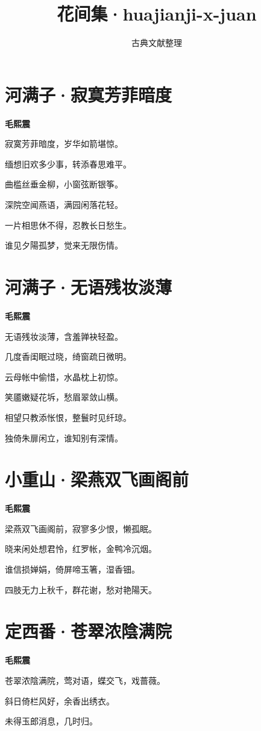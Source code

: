 \documentclass[12pt,a4paper]{ctexbook}
\title{花间集·huajianji-x-juan}
\author{古典文献整理}
\date{}
\begin{document}
\maketitle
\tableofcontents
\newpage
\section{河满子·寂寞芳菲暗度}
\textbf{毛熙震}\par\vspace{0.5em}
寂寞芳菲暗度，岁华如箭堪惊。\par
缅想旧欢多少事，转添春思难平。\par
曲槛丝垂金柳，小窗弦断银筝。\par
深院空闻燕语，满园闲落花轻。\par
一片相思休不得，忍教长日愁生。\par
谁见夕陽孤梦，觉来无限伤情。\par

\section{河满子·无语残妆淡薄}
\textbf{毛熙震}\par\vspace{0.5em}
无语残妆淡薄，含羞亸袂轻盈。\par
几度香闺眠过晓，绮窗疏日微明。\par
云母帐中偷惜，水晶枕上初惊。\par
笑靥嫩疑花坼，愁眉翠敛山横。\par
相望只教添怅恨，整鬟时见纤琼。\par
独倚朱扉闲立，谁知别有深情。\par

\section{小重山·梁燕双飞画阁前}
\textbf{毛熙震}\par\vspace{0.5em}
梁燕双飞画阁前，寂寥多少恨，懒孤眠。\par
晓来闲处想君怜，红罗帐，金鸭冷沉烟。\par
谁信损婵娟，倚屏啼玉箸，湿香钿。\par
四肢无力上秋千，群花谢，愁对艳陽天。\par

\section{定西番·苍翠浓陰满院}
\textbf{毛熙震}\par\vspace{0.5em}
苍翠浓陰满院，莺对语，蝶交飞，戏蔷薇。\par
斜日倚栏风好，余香出绣衣。\par
未得玉郎消息，几时归。\par
\end{document}
